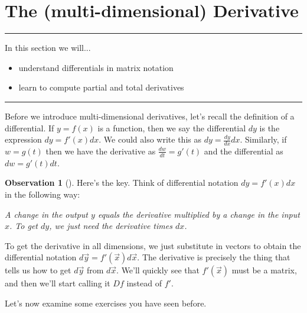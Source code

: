 \documentclass[10pt,]{book}
\theoremstyle{plain}
\theoremstyle{definition}
\theoremstyle{definition}
\newtheorem{observation}[theorem]{Observation}
\theoremstyle{definition}
\theoremstyle{definition}
\newenvironment{objectives}[1]{\noindent\rule{\linewidth}{0.1ex}\newline{\textbf{{\large#1}}\par\smallskip}}{\par\noindent\rule{\linewidth}{0.1ex}\par\smallskip}
\theoremstyle{definition}
\numberwithin{equation}{section}
\begin{document}
\section[{The (multi-dimensional) Derivative}]{The (multi-dimensional) Derivative}\label{ch07_02_multiderivative}
\begin{objectives}{Objectives}\label{objectives-13}
In this section we will...%
%
\begin{itemize}[label=\textbullet]
\item{}understand differentials in matrix notation%
\item{}learn to compute partial and total derivatives%
\end{itemize}
\end{objectives}
Before we introduce multi-dimensional derivatives, let's recall the definition of a differential. If \(y=f(x)\) is a function, then we say the differential \(dy\) is the expression \(dy=f'(x) dx\). We could also write this as \(dy = \frac{dy}{dx}dx\). Similarly, if \(w=g(t)\) then we have the derivative as \(\frac{dw}{dt}=g'(t)\) and the differential as \(dw=g'(t)dt\).%
\begin{observation}[]\label{observation-1}
Here's the key. Think of differential notation \(dy=f'(x)dx\) in the following way:%
\par
\emph{A change in the output \(y\) equals the derivative multiplied by  a change in the input \(x\). To get \(dy\), we just need the derivative times \(dx\).}%
\par
To get the derivative in all dimensions, we just substitute in vectors to obtain the differential notation \(d\vec y = f'(\vec x) d\vec x\). The derivative is precisely the thing that tells us how to get \(d\vec y\) from \(d\vec x\). We'll quickly see that \(f'(\vec x)\) must be a matrix, and then we'll start calling it \(Df\) instead of \(f'\).%
\end{observation}
Let's now examine some exercises you have seen before.%
\end{document}
